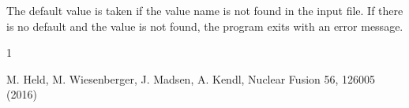 \documentclass{hitec} %
\renewenvironment{thebibliography}[1]{
  \begin{oldthebibliography}{#1}
    \RaggedRight %
    \setlength{\itemsep}{0em}
    \setlength{\parskip}{0em}
}
{
  \end{oldthebibliography}
}
\begin{document}
The default value is taken if the value name is not found in the input file. If there is no default and
the value is not found,
the program exits with an error message.
\begin{thebibliography}{1}
  M. Held, M. Wiesenberger, J. Madsen, A. Kendl,  Nuclear Fusion 56, 126005 (2016)
\end{thebibliography}
\end{document}
